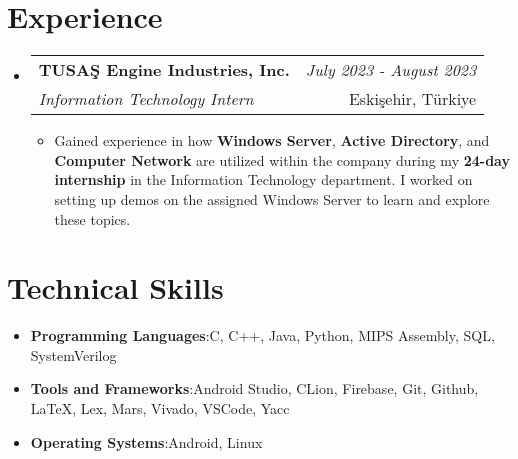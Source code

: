 \documentclass[a4paper,11pt]{article}
\makeatletter
\newcommand{\resumeItem}[2]{
    \item{\textbf{#1}{:\hspace{0.5mm}#2 \vspace{-0.5mm}}}
}
\newcommand{\resumeProject}[4]{
\vspace{0.5mm}\item
    \begin{tabular*}{0.98\textwidth}[t]{l@{\extracolsep{\fill}}r}
    \textbf{#1} & \textit{\footnotesize{#3}} \\
    \footnotesize{\textit{#2}} & \footnotesize{#4}\end{tabular*}\vspace{-2.4mm}
}
\newcommand{\resumeSubItem}[2]{\resumeItem{#1}{#2}\vspace{-4pt}}
\newcommand{\resumeSubHeadingListStart}{\begin{itemize}[leftmargin=*,labelsep=0mm]}
\newcommand{\resumeHeadingSkillStart}{\begin{itemize}[leftmargin=*,itemsep=1.7mm, rightmargin=2ex]}
\newcommand{\resumeItemListStart}{\begin{justify}\begin{itemize}[leftmargin=3ex, rightmargin=2ex, noitemsep,labelsep=1.2mm,itemsep=0mm]\small}
\newcommand{\resumeSubHeadingListEnd}{\end{itemize}\vspace{2mm}}
\newcommand{\resumeHeadingSkillEnd}{\end{itemize}\vspace{-2mm}}
\newcommand{\resumeItemListEnd}{\end{itemize}\end{justify}\vspace{-2mm}}
\makeatother
\begin{document}

\section{\textbf{Experience}}
    \resumeSubHeadingListStart
        \begin{comment}
        \resumeProject
            {Yapı Kredi Teknoloji} {Software Engineering Intern}
            {June 2024 - Current} {İstanbul, Türkiye}
                \resumeItemListStart
                    \item {Working as a {\textbf{Software Engineering Intern}} in the {\textbf{Corporate Architecture}} team under the direction of {\textbf{Architectural Management}}.}
                \resumeItemListEnd
        \end{comment}
        \resumeProject
            {TUSAŞ Engine Industries, Inc.} {Information Technology Intern}
            {July 2023 - August 2023} {Eskişehir, Türkiye}
                \resumeItemListStart
                    \item {Gained experience in how {\textbf{Windows Server}}, {\textbf{Active Directory}}, and {\textbf{Computer Network}} are utilized within the company during my {\textbf{24-day internship}} in the Information Technology department. I worked on setting up demos on the assigned Windows Server to learn and explore these topics.}
                \resumeItemListEnd
    \resumeSubHeadingListEnd
\vspace{-6.5mm}


\section{\textbf{Technical Skills}}
\vspace{1mm}
    \resumeHeadingSkillStart
        \resumeSubItem{Programming Languages}
            {C, C++, Java, Python, MIPS Assembly, SQL, SystemVerilog}
        \resumeSubItem{Tools and Frameworks}
            {Android Studio, CLion, Firebase, Git, Github, LaTeX, Lex, Mars, Vivado, VSCode, Yacc}
        \resumeSubItem{Operating Systems}
            {Android, Linux}
    \resumeHeadingSkillEnd
\vspace{-1mm}
\end{document}
